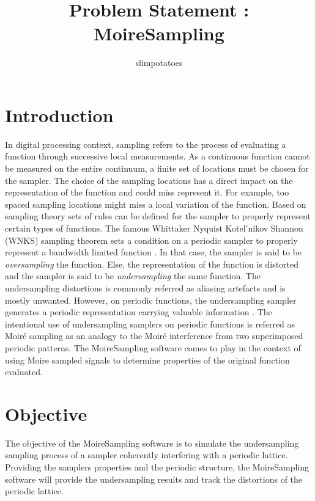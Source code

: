 \documentclass[
11pt,
a4paper,
oneside,
onecolumn,
final %
]{article}
\begin{document}
\title{\huge Problem Statement : \\ MoireSampling}
\author{slimpotatoes}
\maketitle

\clearpage

\tableofcontents
\clearpage

\section{Introduction}

In digital processing context, sampling refers to the process of evaluating a function through successive local measurements. As a continuous function cannot be measured on the entire continuum, a finite set of locations must be chosen for the sampler. The choice of the sampling locations has a direct impact on the representation of the function and could miss represent it. For example, too spaced sampling locations might miss a local variation of the function. Based on sampling theory sets of rules can be defined for the sampler to properly represent certain types of functions. The famous Whittaker Nyquist Kotel'nikov Shannon (WNKS) sampling theorem sets a condition on a periodic sampler to properly represent a bandwidth limited function \cite{Whittaker1910,Nyquist1928,Kotelnikov1933,Shannon1949}. In that case, the sampler is said to be \emph{oversampling} the function. Else, the representation of the function is distorted and the sampler is said to be \emph{undersampling} the same function. The undersampling distortions is commonly referred as aliasing artefacts and is mostly unwanted. However, on periodic functions, the undersampling sampler generates a periodic representation carrying valuable information \cite{Pofelski2020}. The intentional use of undersampling samplers on periodic functions is referred as Moir{\'e} sampling as an analogy to the Moir{\'e} interference from two superimposed periodic patterns. The MoireSampling software comes to play in the context of using Moire sampled signals to determine properties of the original function evaluated.


\section{Objective}

The objective of the MoireSampling software is to simulate the undersampling sampling process of a sampler coherently interfering with a periodic lattice. Providing the samplers properties and the periodic structure, the MoireSampling software will provide 
the undersampling results and track the distortions of the periodic lattice. 
\end{document}

